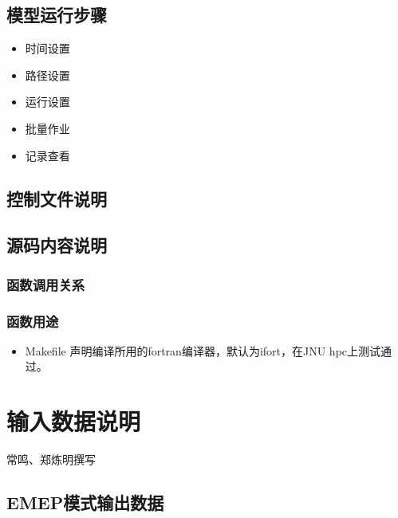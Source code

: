 \documentclass{article}
\begin{document}
\subsection{模型运行步骤}

\begin{itemize}

\item 时间设置

\item 路径设置

\item 运行设置

\item 批量作业

\item 记录查看

\end{itemize}

\subsection{控制文件说明}

\subsection{源码内容说明}

\subsubsection{函数调用关系}

\subsubsection{函数用途}

\begin{itemize}

\item Makefile
声明编译所用的fortran编译器，默认为ifort，在JNU hpc上测试通过。

\end{itemize}

\section{输入数据说明}

{\color{red} 常鸣、郑炼明撰写}

\subsection{EMEP模式输出数据}
\end{document}
